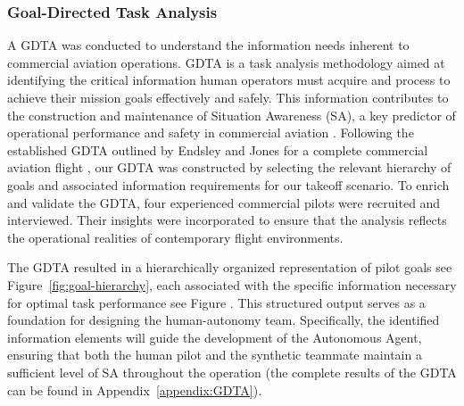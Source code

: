 \documentclass[12pt,a4paper]{article} %
\begin{document}
	\subsubsection{Goal-Directed Task Analysis}
	A GDTA was conducted to understand the information needs inherent to commercial aviation operations. GDTA is a task analysis methodology aimed at identifying the critical information human operators must acquire and process to achieve their mission goals effectively and safely. This information contributes to the construction and maintenance of Situation Awareness (SA), a key predictor of operational performance and safety in commercial aviation \parencite{endsley_here_2017}. %
	Following the established GDTA outlined by Endsley and Jones for a complete commercial aviation flight \parencite{endsley_designing_2003}, our GDTA was constructed by selecting the relevant hierarchy of goals and associated information requirements for our takeoff scenario. To enrich and validate the GDTA, four experienced commercial pilots were recruited and interviewed. Their insights were incorporated to ensure that the analysis reflects the operational realities of contemporary flight environments.

	The GDTA resulted in a hierarchically organized representation of pilot goals see Figure~\ref{fig:goal-hierarchy}, each associated with the specific information necessary for optimal task performance see Figure . This structured output serves as a foundation for designing the human-autonomy team. Specifically, the identified information elements will guide the development of the Autonomous Agent, ensuring that both the human pilot and the synthetic teammate maintain a sufficient level of SA throughout the operation (the complete results of the GDTA can be found in Appendix~\ref{appendix:GDTA}).
\end{document}
